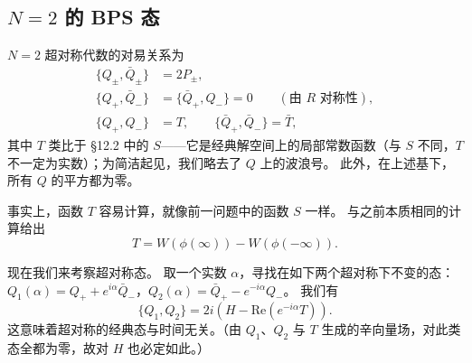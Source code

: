 \subsection{$N=2$ 的 BPS 态}

$N=2$ 超对称代数的对易关系为
\begin{equation}
  \tag{12.16}
  \label{eq:12-16}
  \begin{aligned}
    \{Q_\pm,\bar Q_\pm\}&=2P_\pm,\\
    \{Q_+,\bar Q_-\}&=\{\bar Q_+,Q_-\}=0\qquad(\text{由 }R\text{ 对称性}),\\
    \{Q_+,Q_-\}&=T,\qquad\{\bar Q_+,\bar Q_-\}=\bar T,
  \end{aligned}
\end{equation}
其中 $T$ 类比于 §12.2 中的 $S$——它是经典解空间上的局部常数函数（与 $S$ 不同，$T$ 不一定为实数）；为简洁起见，我们略去了 $Q$ 上的波浪号。
此外，在上述基下，所有 $Q$ 的平方都为零。

事实上，函数 $T$ 容易计算，就像前一问题中的函数 $S$ 一样。
与之前本质相同的计算给出
\begin{equation}
  \tag{12.17}
  \label{eq:12-17}
  T=W(\phi(\infty))-W(\phi(-\infty)).
\end{equation}

现在我们来考察超对称态。
取一个实数 $\alpha$，寻找在如下两个超对称下不变的态：$Q_1(\alpha)=Q_++e^{i\alpha}\bar Q_-$，$Q_2(\alpha)=\bar Q_+-e^{-i\alpha}Q_-$。
我们有
\begin{equation}
  \tag{12.18}
  \label{eq:12-18}
  \{Q_1,Q_2\}=2i\left(H-\mathrm{Re}(e^{-i\alpha}T)\right).
\end{equation}
这意味着超对称的经典态与时间无关。（由 $Q_1$、$Q_2$ 与 $T$ 生成的辛向量场，对此类态全都为零，故对 $H$ 也必定如此。）


